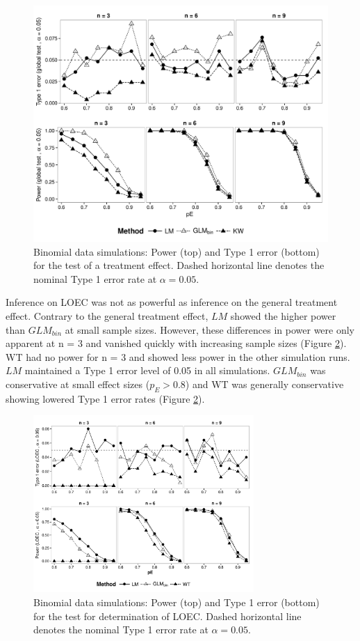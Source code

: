 \documentclass[twocolumn, natbib]{svjour3}
\begin{document}
\begin{figure}
  \centering
  \includegraphics[width = 129mm]{p_glob_p.pdf}
  \caption{
  Binomial data simulations: 
  Power (top) and Type 1 error (bottom) for the test of a treatment effect. 
  Dashed horizontal line denotes the nominal Type 1 error rate at $\alpha = 0.05$.
  }
  \label{fig:p_glob_p}
\end{figure}

Inference on LOEC was not as powerful as inference on the general treatment effect.
Contrary to the general treatment effect, $LM$ showed the higher power than $GLM_{bin}$ at small sample sizes.
However, these differences in power were only apparent at n = 3 and vanished quickly with increasing sample sizes (Figure \ref{fig:p_loec_p}). 
WT had no power for n = 3 and showed less power in the other simulation runs.
$LM$ maintained a Type 1 error level of 0.05 in all simulations. 
$GLM_{bin}$ was conservative at small effect sizes ($p_E > 0.8$) and WT was generally conservative showing lowered Type 1 error rates (Figure \ref{fig:p_loec_p}).

\begin{figure}
  \centering
  \includegraphics[width = 84mm]{p_loec_p.pdf}
  \caption{
  Binomial data simulations: 
  Power (top) and Type 1 error (bottom) for the test for determination of LOEC. 
  Dashed horizontal line denotes the nominal Type 1 error rate at $\alpha = 0.05$.
  }
  \label{fig:p_loec_p}
\end{figure}
\end{document}
